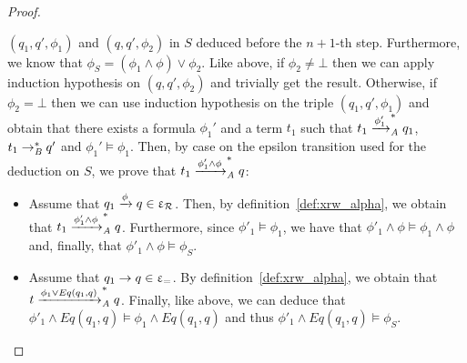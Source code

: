 \begin{proof}
\begin{itemize}
\begin{itemize}
    $(q_1,q',\phi_1)$ and $(q,q',\phi_2)$ in $S$ deduced before the $n+1$-th
    step. Furthermore, we know that $\phi_S=(\phi_1 \wedge \phi) \vee \phi_2$.
    Like above, if $\phi_2 \neq \bot$ then we can apply induction hypothesis on
    $(q,q',\phi_2)$ and trivially get the result. Otherwise, if $\phi_2=\bot$
    then we can use induction hypothesis on the triple $(q_1,q',\phi_1)$ and
    obtain that there exists a formula $\phi_1'$ and a term $t_1$ such that 
    $t_1\xrightarrow{\phi_1'}_\mathit A^* q_1$, $t_1 \rightarrow_\mathit B^* q'$ and $\phi_1' \models \phi_1$.
    Then, by case on the epsilon transition used for the deduction on $S$, we
    prove that $t_1 \xrightarrow{\phi_1'\wedge \phi}_\mathit A^* q$:

    \begin{itemize}
    \item Assume that $q_1 \xrightarrow{\phi} q \in \upvarepsilon_{\mathcal R}$. Then, by
      definition~\ref{def:xrw_alpha}, we obtain that $t_1 \xrightarrow{\phi'_1
        \wedge \phi}_\mathit A^* q$. Furthermore, since $\phi'_1 \models \phi_1$, we have
      that $\phi'_1 \wedge \phi \models \phi_1 \wedge \phi$ and, finally, that 
      $\phi'_1 \wedge \phi \models \phi_S$.

    \item Assume that $q_1 \rightarrow q \in \upvarepsilon_{=}$. By
      definition~\ref{def:xrw_alpha}, we obtain that $t \xrightarrow{\phi_1 \lor Eq(q_1, q)}_\mathit A^* q$.
      Finally, like above, we can deduce that
      $\phi'_1 \wedge Eq(q_1,q) \models \phi_1 \wedge Eq(q_1,q)$ and thus $\phi'_1 \wedge
      Eq(q_1,q) \models \phi_S$.
    \end{itemize}
  \end{itemize}
\end{itemize}
\end{proof}




